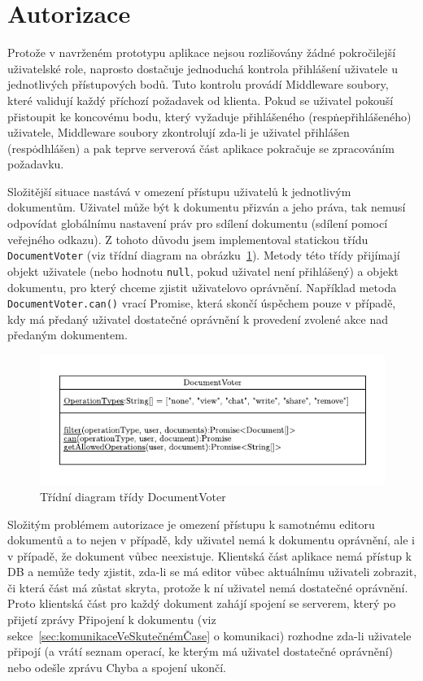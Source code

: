 
\section{Autorizace}\label{sec:autorizace}

Protože v navrženém prototypu aplikace nejsou rozlišovány žádné pokročilejší uživatelské role, naprosto dostačuje jednoduchá kontrola přihlášení uživatele u jednotlivých přístupových bodů.
Tuto kontrolu provádí Middleware soubory, které validují každý příchozí požadavek od klienta.
Pokud se uživatel pokouší přistoupit ke koncovému bodu, který vyžaduje přihlášeného (resp\. nepřihlášeného) uživatele, Middleware soubory zkontrolují zda-li je uživatel přihlášen (resp\. odhlášen) a pak teprve serverová část aplikace pokračuje se zpracováním požadavku.

Složitější situace nastává v omezení přístupu uživatelů k jednotlivým dokumentům.
Uživatel může být k dokumentu přizván a jeho práva, tak nemusí odpovídat globálnímu nastavení práv pro sdílení dokumentu (sdílení pomocí veřejného odkazu).
Z tohoto důvodu jsem implementoval statickou třídu \texttt{DocumentVoter} (viz třídní diagram na obrázku~\ref{fig:DocumentVoter}).
Metody této třídy přijímají objekt uživatele (nebo hodnotu \texttt{null}, pokud uživatel není přihlášený) a objekt dokumentu, pro který chceme zjistit uživatelovo oprávnění.
Například metoda \texttt{DocumentVoter.can()} vrací Promise, která skončí úspěchem pouze v případě, kdy má předaný uživatel dostatečné oprávnění k provedení zvolené akce nad předaným dokumentem.

\begin{figure}[ht!]
    \centering
    \includegraphics[width=\textwidth]{partials/realizace/DocumentVoter.pdf}
    \caption{Třídní diagram třídy DocumentVoter}\label{fig:DocumentVoter}
\end{figure}

Složitým problémem autorizace je omezení přístupu k samotnému editoru dokumentů a to nejen v případě, kdy uživatel nemá k dokumentu oprávnění, ale i v případě, že dokument vůbec neexistuje.
Klientská část aplikace nemá přístup k DB a nemůže tedy zjistit, zda-li se má editor vůbec aktuálnímu uživateli zobrazit, či která část má zůstat skryta, protože k ní uživatel nemá dostatečné oprávnění.
Proto klientská část pro každý dokument zahájí spojení se serverem, který po přijetí zprávy Připojení k dokumentu (viz sekce~\ref{sec:komunikaceVeSkutečnémČase} o komunikaci) rozhodne zda-li uživatele připojí (a vrátí seznam operací, ke kterým má uživatel dostatečné oprávnění) nebo odešle zprávu Chyba a spojení ukončí.


